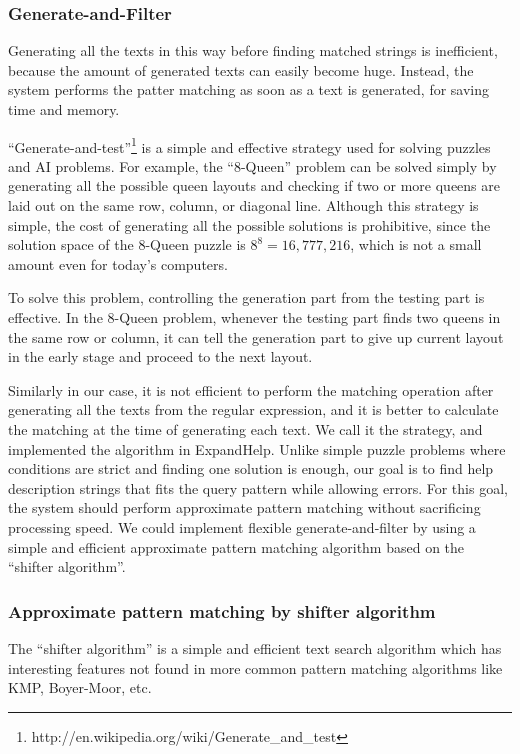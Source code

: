 \documentclass{sigchi}
\def\EH{\textsf{ExpandHelp}}
\begin{document}
\subsubsection{Generate-and-Filter}

Generating all the texts in this way before finding matched strings is
inefficient, because the amount of generated texts can easily become huge.
Instead, the system performs the patter matching as soon as a text is generated,
for saving time and memory.

``Generate-and-test''\footnote{
  {\sf http:{\slash}{\slash}en.wikipedia.org{\slash}wiki{\slash}Generate\_and\_test}
}
is a simple and effective strategy
used for solving puzzles and AI problems.
For example,
the ``8-Queen'' problem can be solved simply by
generating all the possible queen layouts and checking if
two or more queens are laid out on the same row, column, or diagonal line.
Although this strategy is simple, the cost of
generating all the possible solutions is prohibitive, since
the solution space of the 8-Queen puzzle is $8^8 = 16,777,216$,
which is not a small amount even for today's computers.

To solve this problem,
controlling the generation part from the testing part is effective.
In the 8-Queen problem,
whenever the testing part finds two queens in the same row or column,
it can tell the generation part to
give up current layout in the early stage and proceed to the next layout.

Similarly in our case,
it is not efficient to perform the matching operation
after generating all the texts from the regular expression,
and it is better to calculate the matching
at the time of generating each text.
We call it the  strategy,
and implemented the algorithm in {\EH}.
Unlike simple puzzle problems where
conditions are strict and finding one solution is enough,
our goal is to find help description strings
that fits the query pattern while allowing errors.
For this goal,
the system should perform approximate pattern matching
without sacrificing processing speed.
%
We could implement flexible generate-and-filter by using a simple and efficient
approximate pattern matching algorithm based on the ``shifter algorithm''.

\subsubsection{Approximate pattern matching by shifter algorithm}

The ``shifter algorithm''\cite{Wu:1992:FTS:135239.135244}
is a simple and efficient
text search algorithm which has interesting features
not found in more common pattern matching algorithms like
KMP\cite{KMP}, Boyer-Moor\cite{Boyer:1977:FSS:359842.359859}, etc.
\end{document}
